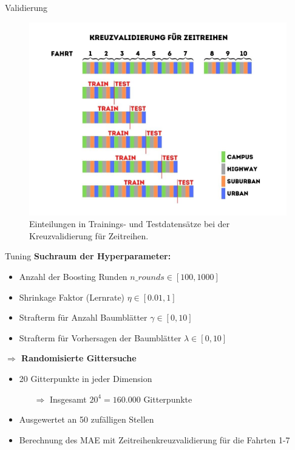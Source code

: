 \begin{frame}{Validierung}
	\begin{figure}[h]
		\centering
		\includegraphics[scale=0.33]{kreuzvalidierung}
		\caption{Einteilungen in Trainings- und Testdatensätze bei der Kreuzvalidierung für Zeitreihen.}
		\label{kreuzvalidierung}
	\end{figure}
\end{frame}

\begin{frame}{Tuning}
    \textbf{Suchraum der Hyperparameter:}
    \begin{itemize}
        \item Anzahl der Boosting Runden $n\_rounds \in [100, 1000]$
        \item \glqq Shrinkage \grqq{} Faktor (Lernrate) $\eta \in [0.01, 1]$
        \item Strafterm f\"ur Anzahl Baumbl\"atter $\gamma \in [0, 10]$
        \item Strafterm f\"ur Vorhersagen der Baumbl\"atter $\lambda \in [0, 10]$
    \end{itemize}
    \textbf{$\Rightarrow$ Randomisierte Gittersuche}
    \begin{itemize}
        \item 20 Gitterpunkte in jeder Dimension
        \begin{itemize}
            \item[$\Rightarrow$] Insgesamt $20^4 = 160.000$ Gitterpunkte
        \end{itemize}
        \item Ausgewertet an 50 zuf\"alligen Stellen
        \item Berechnung des MAE mit Zeitreihenkreuzvalidierung f\"ur die Fahrten 1-7
    \end{itemize}
\end{frame}

